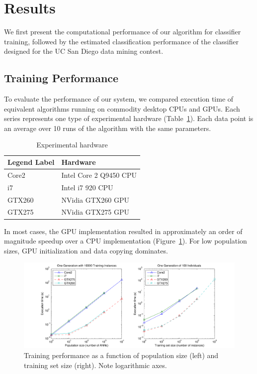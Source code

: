 \documentclass[11pt]{article}       %
\begin{document}
\section{Results} \label{results}
We first present the computational performance of our algorithm for classifier training, followed by the estimated classification performance of the classifier designed for the UC San Diego data mining contest.

\subsection{Training Performance} \label{performance}
To evaluate the performance of our system, we compared execution time of equivalent algorithms running on commodity desktop CPUs and GPUs. Each series represents one type of experimental hardware (Table~\ref{tab:experimental-hardware}). Each data point is an average over 10 runs of the algorithm with the same parameters.

\begin{table}[h]
	\centering
	\begin{tabular}{ll}
	\textbf{Legend Label} & \textbf{Hardware} \\
	\hline
	Core2 & Intel Core 2 Q9450 CPU \\
	i7 & Intel i7 920 CPU \\
	GTX260 & NVidia GTX260 GPU \\
	GTX275 & NVidia GTX275 GPU \\
	\hline
	\end{tabular}
	\caption{Experimental hardware}
	\label{tab:experimental-hardware}
\end{table}

In most cases, the GPU implementation resulted in approximately an order of magnitude speedup over a CPU implementation (Figure~\ref{fig:training-performance}). For low population sizes, GPU initialization and data copying dominates.

\begin{figure}[h]
	\includegraphics[width=\textwidth]{fig-performance}
	\caption{Training performance as a function of population size (left) and training set size (right). Note logarithmic axes.}
	\label{fig:training-performance}
\end{figure}
\end{document}
